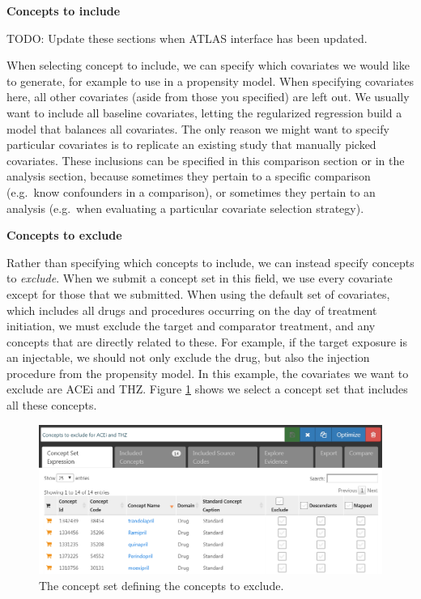 \documentclass[11pt]{book}
\theoremstyle{definition}
\theoremstyle{definition}
\theoremstyle{definition}
\theoremstyle{remark}
\begin{document}
\textbf{Concepts to include}

TODO: Update these sections when ATLAS interface has been updated.

When selecting concept to include, we can specify which covariates we would like to generate, for example to use in a propensity model. When specifying covariates here, all other covariates (aside from those you specified) are left out. We usually want to include all baseline covariates, letting the regularized regression build a model that balances all covariates. The only reason we might want to specify particular covariates is to replicate an existing study that manually picked covariates. These inclusions can be specified in this comparison section or in the analysis section, because sometimes they pertain to a specific comparison (e.g.~know confounders in a comparison), or sometimes they pertain to an analysis (e.g.~when evaluating a particular covariate selection strategy).

\textbf{Concepts to exclude}

Rather than specifying which concepts to include, we can instead specify concepts to \emph{exclude}. When we submit a concept set in this field, we use every covariate except for those that we submitted. When using the default set of covariates, which includes all drugs and procedures occurring on the day of treatment initiation, we must exclude the target and comparator treatment, and any concepts that are directly related to these. For example, if the target exposure is an injectable, we should not only exclude the drug, but also the injection procedure from the propensity model. In this example, the covariates we want to exclude are ACEi and THZ. Figure \ref{fig:covsToExclude} shows we select a concept set that includes all these concepts.

\begin{figure}

{\centering \includegraphics[width=1\linewidth]{images/PopulationLevelEstimation/covsToExclude} 

}

\caption{The concept set defining the concepts to exclude.}\label{fig:covsToExclude}
\end{figure}
\end{document}
